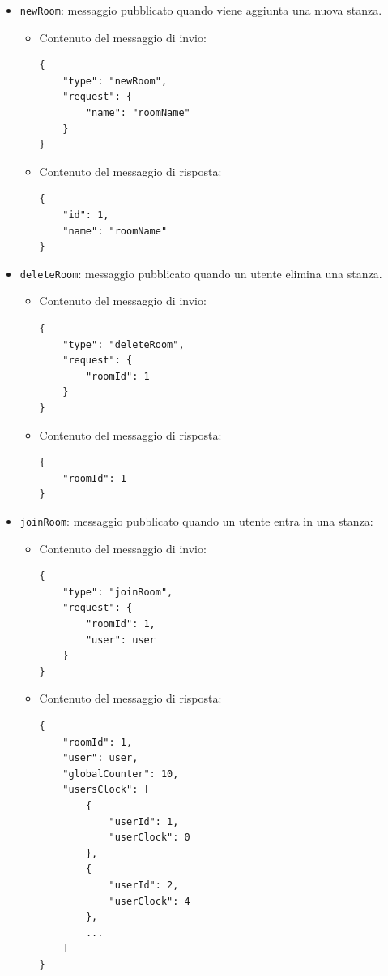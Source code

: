 \documentclass[a4paper]{article}
\begin{document}
\begin{itemize}
    \item \texttt{newRoom}: messaggio pubblicato quando viene aggiunta una nuova stanza.
        \begin{itemize}
            \item Contenuto del messaggio di invio:
            \begin{verbatim}
{
    "type": "newRoom",
    "request": {
        "name": "roomName"
    } 
}
            \end{verbatim}
            \item Contenuto del messaggio di risposta:
            \begin{verbatim}
{
    "id": 1,
    "name": "roomName"
}
            \end{verbatim}
        \end{itemize}

    \item \texttt{deleteRoom}: messaggio pubblicato quando un utente elimina una stanza.
        \begin{itemize}
            \item Contenuto del messaggio di invio:
            \begin{verbatim}
{
    "type": "deleteRoom",
    "request": {
        "roomId": 1
    } 
}
            \end{verbatim}
            \item Contenuto del messaggio di risposta:
            \begin{verbatim}
{
    "roomId": 1
}
            \end{verbatim}
        \end{itemize}    

    \item \texttt{joinRoom}: messaggio pubblicato quando un utente entra in una stanza:
        \begin{itemize}
            \item Contenuto del messaggio di invio:
            \begin{verbatim}
{
    "type": "joinRoom",
    "request": {
        "roomId": 1,
        "user": user
    } 
}
            \end{verbatim}
            \item Contenuto del messaggio di risposta:
            \begin{verbatim}
{
    "roomId": 1,
    "user": user,
    "globalCounter": 10,
    "usersClock": [
        {
            "userId": 1,
            "userClock": 0
        },
        {
            "userId": 2,
            "userClock": 4
        },
        ...
    ]
}
            \end{verbatim}
        \end{itemize}   


\end{itemize}
\end{document}
